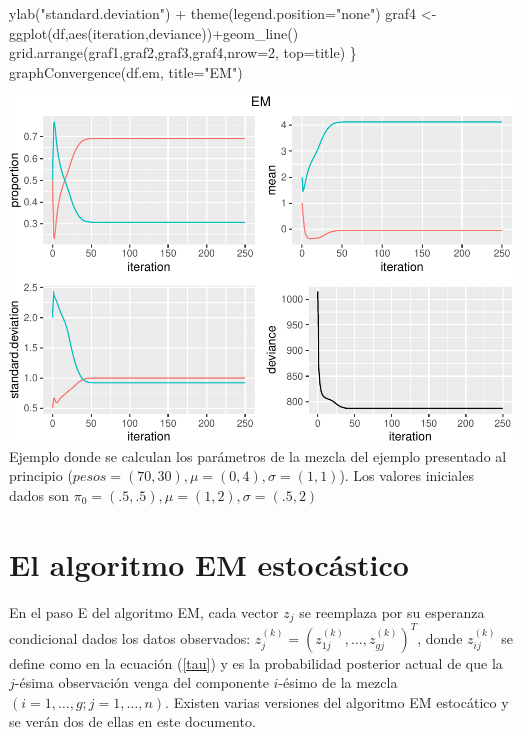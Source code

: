 \documentclass[
]{article}
\newenvironment{Shaded}{\begin{snugshade}}{\end{snugshade}}
\newcommand{\AttributeTok}[1]{\textcolor[rgb]{0.77,0.63,0.00}{#1}}
\newcommand{\DecValTok}[1]{\textcolor[rgb]{0.00,0.00,0.81}{#1}}
\newcommand{\FunctionTok}[1]{\textcolor[rgb]{0.00,0.00,0.00}{#1}}
\newcommand{\NormalTok}[1]{#1}
\newcommand{\OtherTok}[1]{\textcolor[rgb]{0.56,0.35,0.01}{#1}}
\newcommand{\SpecialCharTok}[1]{\textcolor[rgb]{0.00,0.00,0.00}{#1}}
\newcommand{\StringTok}[1]{\textcolor[rgb]{0.31,0.60,0.02}{#1}}
\begin{document}
\begin{Shaded}
\begin{Highlighting}[]
    \FunctionTok{ylab}\NormalTok{(}\StringTok{"standard.deviation"}\NormalTok{) }\SpecialCharTok{+}  \FunctionTok{theme}\NormalTok{(}\AttributeTok{legend.position=}\StringTok{"none"}\NormalTok{) }
\NormalTok{  graf4 }\OtherTok{\textless{}{-}} \FunctionTok{ggplot}\NormalTok{(df,}\FunctionTok{aes}\NormalTok{(iteration,deviance))}\SpecialCharTok{+}\FunctionTok{geom\_line}\NormalTok{()  }
  \FunctionTok{grid.arrange}\NormalTok{(graf1,graf2,graf3,graf4,}\AttributeTok{nrow=}\DecValTok{2}\NormalTok{, }\AttributeTok{top=}\NormalTok{title)}
\NormalTok{\}}
\FunctionTok{graphConvergence}\NormalTok{(df.em, }\AttributeTok{title=}\StringTok{"EM"}\NormalTok{)}
\end{Highlighting}
\end{Shaded}

\includegraphics{Reporte0108_files/figure-latex/unnamed-chunk-7-1.pdf}
Ejemplo donde se calculan los parámetros de la mezcla del ejemplo
presentado al principio (\(pesos=(70,30),\mu=(0,4),\sigma=(1,1)\)). Los
valores iniciales dados son \(\pi_0=(.5,.5),\mu=(1,2),\sigma=(.5,2)\)

\section{El algoritmo EM estocástico}

En el paso E del algoritmo EM, cada vector \(z_j\) se reemplaza por su
esperanza condicional dados los datos observados:
\(z_j^{(k)}=(z_{1j}^{(k)},\ldots,z_{gj}^{(k)})^T\), donde
\(z_{ij}^{(k)}\) se define como en la ecuación (\ref{tau}) y es la
probabilidad posterior actual de que la \(j\)-ésima observación venga
del componente \(i\)-ésimo de la mezcla \((i=1,\ldots,g;j=1,\ldots,n)\).
Existen varias versiones del algoritmo EM estocático y se verán dos de
ellas en este documento.
\end{document}
